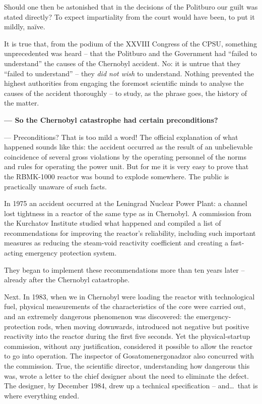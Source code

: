 \documentclass[openright]{bookest}
\begin{document}
Should one then be astonished that in the decisions of the Politburo our guilt was stated directly? To expect impartiality from the court would have been, to put it mildly, naïve.

It is true that, from the podium of the XXVIII Congress of the CPSU, something unprecedented was heard -- that the Politburo and the Government had ``failed to understand'' the causes of the Chernobyl accident. No: it is untrue that they ``failed to understand'' -- they \textit{did not wish} to understand. Nothing prevented the highest authorities from engaging the foremost scientific minds to analyse the causes of the accident thoroughly -- to study, as the phrase goes, the history of the matter.

\medskip

\textbf{--- So the Chernobyl catastrophe had certain preconditions?}

\noindent
--- Preconditions? That is too mild a word! The official explanation of what happened sounds like this: the accident occurred as the result of an unbelievable coincidence of several gross violations by the operating personnel of the norms and rules for operating the power unit. But for me it is very easy to prove that the RBMK-1000 reactor was bound to explode somewhere. The public is practically unaware of such facts.

In 1975 an accident occurred at the Leningrad Nuclear Power Plant: a channel lost tightness in a reactor of the same type as in Chernobyl. A commission from the Kurchatov Institute studied what happened and compiled a list of recommendations for improving the reactor's reliability, including such important measures as reducing the steam-void reactivity coefficient and creating a fast-acting emergency protection system.

They began to implement these recommendations more than ten years later -- already after the Chernobyl catastrophe.

Next. In 1983, when we in Chernobyl were loading the reactor with technological fuel, physical measurements of the characteristics of the core were carried out, and an extremely dangerous phenomenon was discovered: the emergency-protection rods, when moving downwards, introduced not negative but positive reactivity into the reactor during the first five seconds. Yet the physical-startup commission, without any justification, considered it possible to allow the reactor to go into operation. The inspector of Gosatomenergonadzor also concurred with the commission. True, the scientific director, understanding how dangerous this was, wrote a letter to the chief designer about the need to eliminate the defect. The designer, by December 1984, drew up a technical specification -- and\ldots~that is where everything ended.
\end{document}
